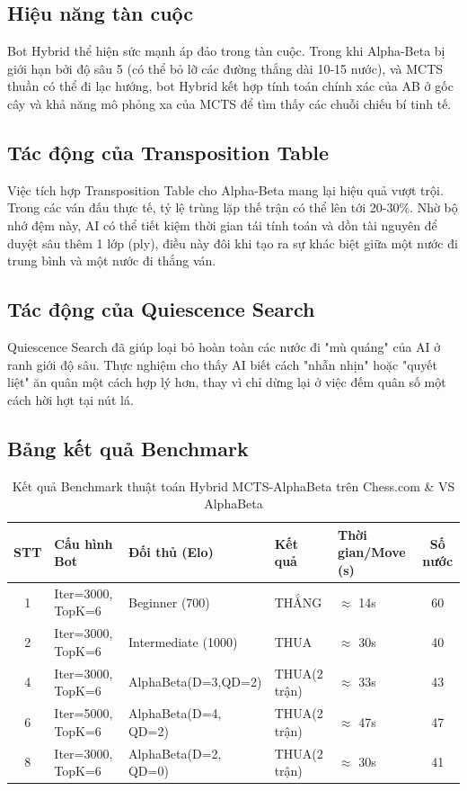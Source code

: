 \subsection{Hiệu năng tàn cuộc}
Bot Hybrid thể hiện sức mạnh áp đảo trong tàn cuộc. Trong khi Alpha-Beta bị giới hạn bởi độ sâu 5 (có thể bỏ lỡ các đường thắng dài 10-15 nước), và MCTS thuần có thể đi lạc hướng, bot Hybrid kết hợp tính toán chính xác của AB ở gốc cây và khả năng mô phỏng xa của MCTS để tìm thấy các chuỗi chiếu bí tinh tế.

\subsection{Tác động của Transposition Table}
Việc tích hợp Transposition Table cho Alpha-Beta mang lại hiệu quả vượt trội. Trong các ván đấu thực tế, tỷ lệ trùng lặp thế trận có thể lên tới 20-30\%. Nhờ bộ nhớ đệm này, AI có thể tiết kiệm thời gian tái tính toán và dồn tài nguyên để duyệt sâu thêm 1 lớp (ply), điều này đôi khi tạo ra sự khác biệt giữa một nước đi trung bình và một nước đi thắng ván.

\subsection{Tác động của Quiescence Search}
Quiescence Search đã giúp loại bỏ hoàn toàn các nước đi "mù quáng" của AI ở ranh giới độ sâu. Thực nghiệm cho thấy AI biết cách "nhẫn nhịn" hoặc "quyết liệt" ăn quân một cách hợp lý hơn, thay vì chỉ dừng lại ở việc đếm quân số một cách hời hợt tại nút lá.

\subsection{Bảng kết quả Benchmark}

\begin{table}[H]
\centering
\caption{Kết quả Benchmark thuật toán Hybrid MCTS-AlphaBeta trên Chess.com \& VS AlphaBeta}
\label{tab:hybridmcts_benchmark}
\begin{tabularx}{\textwidth}{|c|X|l|l|X|c|}
\hline
\textbf{STT} & \textbf{Cấu hình Bot} & \centering \textbf{Đối thủ (Elo)} & \textbf{Kết quả} & \textbf{Thời gian/Move (s)} & \textbf{Số nước} \\ \hline
1  & Iter=3000, TopK=6 & Beginner (700)  & THẮNG  & $\approx$ 14s & 60 \\ \hline
2  & Iter=3000, TopK=6 & Intermediate (1000)  &  THUA &  $\approx$ 30s & 40 \\ \hline
4 & Iter=3000, TopK=6 & AlphaBeta(D=3,QD=2) & THUA(2 trận) & $\approx$ 33s & 43 \\ \hline
6 & Iter=5000, TopK=6 & AlphaBeta(D=4, QD=2) & THUA(2 trận) & $\approx$ 47s & 47\\ \hline
8 & Iter=3000, TopK=6 & AlphaBeta(D=2, QD=0) & THUA(2 trận) & $\approx$ 30s & 41\\ \hline
\end{tabularx}
\end{table}

